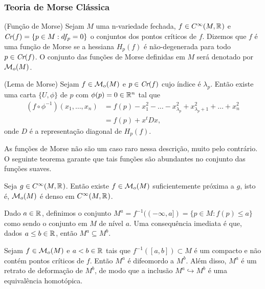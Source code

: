 \documentclass{beamer}
\begin{document}
	\begin{frame}
		\frametitle{Teoria de Morse Clássica}
		\begin{definicao}
			(Função de Morse) Sejam $M$ uma n-variedade fechada, $f \in C^{\infty}(M, \mathbb{R}^{})$ e $\textit{Cr}(f) = \{p \in M: df_{p} = 0\}$ o conjuntos dos pontos críticos de $f$. Dizemos que $f$ é uma função de Morse se a hessiana $H_{p}(f)$ é não-degenerada para todo $p \in \textit{Cr}(f)$. O conjunto das funções de Morse definidas em $M$ será denotado por $\mathcal{M}_{o}(M)$. 
		\end{definicao}
		\begin{lema}
			(Lema de Morse) Sejam $f \in \mathcal{M}_{o}(M)$ e $p \in \textit{Cr}(f)$ cujo índice é $\lambda_{p}$. Então existe uma carta $\{U, \phi\}$ de $p$ com $\phi(p)=0 \in \mathbb{R}^{n}$ tal que 
			$$
			\begin{aligned}
			(f\circ \phi^{-1})(x_{1}, \dots, x_{n}) &= f(p)-x_{1}^{2}-\dots -x^{2}_{\lambda_{p}}+x^{2}_{\lambda_{p}+1}+\dots + x^{2}_{n}
			\\
			&=f(p)+x^{t}Dx,
			\end{aligned}
			$$
			onde $D$ é a representação diagonal de $H_{p}(f)$.
		\end{lema}
	\end{frame}
	
	\begin{frame}
		As funções de Morse não são um caso raro nessa descrição, muito pelo contrário. O seguinte teorema garante que tais funções são abundantes no conjunto das funções suaves.
		\begin{teorema}
			Seja $g\in C^{\infty}(M, \mathbb{R}^{})$. Então existe $f \in \mathcal{M}_{o}(M)$ suficientemente próxima a $g$, isto é, $\mathcal{M}_{o}(M)$ é denso em $C^{\infty}(M, \mathbb{R}^{})$.
		\end{teorema}
		
		\pause
		Dado $a \in \mathbb{R}^{}$, definimos o conjunto $M^{a}= f^{-1}((-\infty, a]) = \{p \in M: f(p)\leq a\}$ como sendo o conjunto em $M$ de nível $a$. Uma consequência imediata é que, dados $a\leq b \in \mathbb{R}^{}$, então $M^{a} \subseteq M^{b}$.
		
		\pause
		\begin{teorema}
			Sejam $f \in \mathcal{M}_{o}(M)$ e $a<b \in \mathbb{R}^{}$ tais que $f^{-1}([a,b])\subset M$ é um compacto e não contém pontos críticos de $f$. Então $M^{a}$ é difeomordo a $M^{b}$. Além disso, $M^{a}$ é um retrato de deformação de $M^{b}$, de modo que a inclusão  $M^{a} \hookrightarrow M^{b}$ é uma equivalência homotópica.
		\end{teorema}
		
	\end{frame}
	
\end{document}
